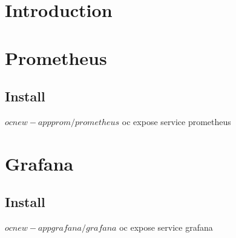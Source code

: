 

\section{Introduction}

\section{Prometheus}

\subsection{Install}

\begin{bashcode}
  $ oc new-app prom/prometheus
  $ oc expose service prometheus
\end{bashcode}

\section{Grafana}

\subsection{Install}

\begin{bashcode}
  $ oc new-app grafana/grafana
  $ oc expose service grafana
\end{bashcode}
